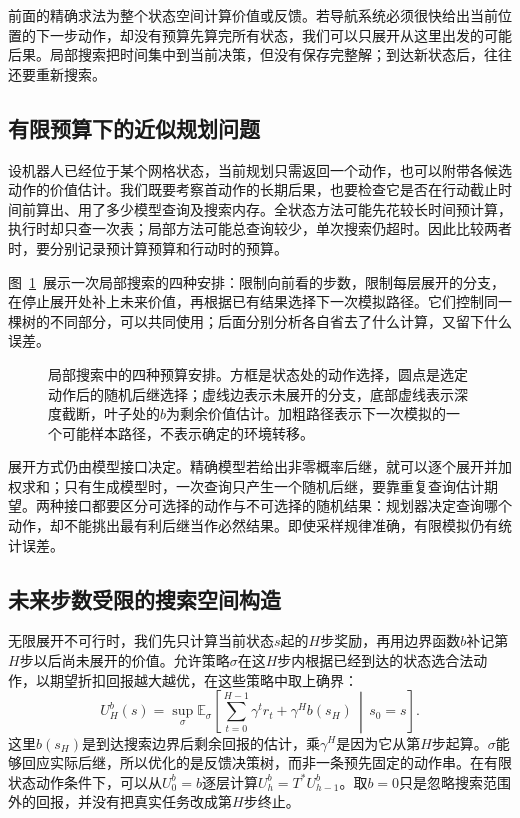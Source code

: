 前面的精确求法为整个状态空间计算价值或反馈。若导航系统必须很快给出当前位置的下一步动作，却没有预算先算完所有状态，我们可以只展开从这里出发的可能后果。局部搜索把时间集中到当前决策，但没有保存完整解；到达新状态后，往往还要重新搜索。

\subsection{有限预算下的近似规划问题}
\label{sec:rl-planning-local-budget}

设机器人已经位于某个网格状态，当前规划只需返回一个动作，也可以附带各候选动作的价值估计。我们既要考察首动作的长期后果，也要检查它是否在行动截止时间前算出、用了多少模型查询及搜索内存。全状态方法可能先花较长时间预计算，执行时却只查一次表；局部方法可能总查询较少，单次搜索仍超时。因此比较两者时，要分别记录预计算预算和行动时的预算。

图~\ref{fig:rl-planning-search-tree}~展示一次局部搜索的四种安排：限制向前看的步数，限制每层展开的分支，在停止展开处补上未来价值，再根据已有结果选择下一次模拟路径。它们控制同一棵树的不同部分，可以共同使用；后面分别分析各自省去了什么计算，又留下什么误差。

\begin{figure}[htbp]
 \centering
 
 \caption{局部搜索中的四种预算安排。方框是状态处的动作选择，圆点是选定动作后的随机后继选择；虚线边表示未展开的分支，底部虚线表示深度截断，叶子处的$b$为剩余价值估计。加粗路径表示下一次模拟的一个可能样本路径，不表示确定的环境转移。}
 \label{fig:rl-planning-search-tree}
\end{figure}

展开方式仍由模型接口决定。精确模型若给出非零概率后继，就可以逐个展开并加权求和；只有生成模型时，一次查询只产生一个随机后继，要靠重复查询估计期望。两种接口都要区分可选择的动作与不可选择的随机结果：规划器决定查询哪个动作，却不能挑出最有利后继当作必然结果。即使采样规律准确，有限模拟仍有统计误差。

\subsection{未来步数受限的搜索空间构造}
\label{sec:rl-planning-horizon-search}

无限展开不可行时，我们先只计算当前状态$s$起的$H$步奖励，再用边界函数$b$补记第$H$步以后尚未展开的价值。允许策略$\sigma$在这$H$步内根据已经到达的状态选合法动作，以期望折扣回报越大越优，在这些策略中取上确界：
\begin{equation}
 U_H^b(s)=\sup_\sigma\mathbb E_\sigma\!\left[
 \sum_{t=0}^{H-1}\gamma^t r_t+\gamma^H b(s_H)
 \,\middle|\,s_0=s\right].
 \label{eq:rl-planning-lookahead}
\end{equation}
这里$b(s_H)$是到达搜索边界后剩余回报的估计，乘$\gamma^H$是因为它从第$H$步起算。$\sigma$能够回应实际后继，所以优化的是反馈决策树，而非一条预先固定的动作串。在有限状态动作条件下，可以从$U_0^b=b$逐层计算$U_h^b=T^*U_{h-1}^b$。取$b=0$只是忽略搜索范围外的回报，并没有把真实任务改成第$H$步终止。

